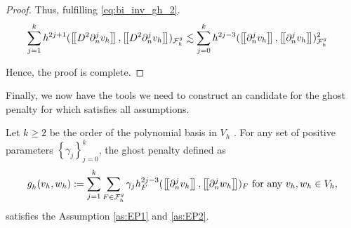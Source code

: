 \begin{proof}
        Thus, fulfilling \eqref{eq:bi_inv_gh_2}.
        \begin{equation}
            \begin{split}
         \sum_{j=1}^{k} h^{2j+1} ( \jump{   D^2 \partial ^{j}_{n}  v_{h} }, \jump{  D^2 \partial ^{j}_{n}  v_{h}}    )_{\mathcal{F}_{h}^{g}} & \lesssim  \sum_{j=0}^{k} h^{2j-3}  (\jump{    \partial ^{j}_{n}  v_{h} }, \jump{ \partial ^{j}_{n}  v_{h} }  )_{\mathcal{F} _{h}^{g}  }^{2  }
            \end{split}
        \end{equation}

    Hence, the proof is complete.

\end{proof}


Finally, we now have the tools we need to construct an candidate for the ghost penalty for which satisfies all assumptions.

\begin{proposition}
    Let $k\ge  2$ be the order of the polynomial basis in $V_{h}$ .
    For any set of positive parameters $\left\{ \gamma _{j} \right\} _{j=0}^{k}$, the ghost penalty defined as
    \begin{equation}
        \label{eq:ghost_penalty}
    g^{}_{h}( v_{h},w_{h})  := \sum_{j=1}^{k} \sum_{F \in \mathcal{F} _{h}^{g}}^{} \gamma _{j} h^{2j-3}_{F} ( \left[\!\left[  \partial ^{j}_{n} v_{h}  \right]\!\right], \left[\!\left[  \partial ^{j}_{n} w_{h}  \right]\!\right]  ) _{F} \text{ for any } v_{h},w_{h} \in V_{h},
    \end{equation}
    satisfies the Assumption \ref{as:EP1} and \ref{as:EP2}.
\end{proposition}

